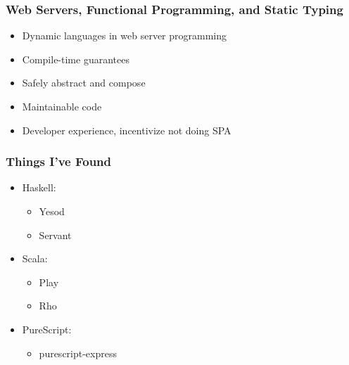 \begin{frame}
  \frametitle{Web Servers, Functional Programming, and Static Typing}
  \begin{itemize}
    \pause
    \item<+-> Dynamic languages in web server programming
    \item<+-> Compile-time guarantees
    \item<+-> Safely abstract and compose
    \item<+-> Maintainable code
    \item<+-> Developer experience, incentivize not doing SPA
  \end{itemize}
\end{frame}

\begin{frame}
  \frametitle{Things I've Found}
  \begin{itemize}
    \pause
    \item<+-> Haskell:
      \begin{itemize}
        \item<+-> Yesod
        \item<+-> Servant
      \end{itemize}
    \item<+-> Scala:
      \begin{itemize}
        \item<+-> Play
        \item<+-> Rho
      \end{itemize}
    \item<+-> PureScript:
      \begin{itemize}
        \item<+-> purescript-express
      \end{itemize}
  \end{itemize}
\end{frame}

